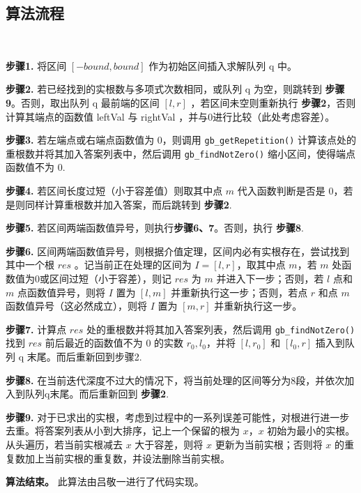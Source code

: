\subsection{算法流程}

\begin{algorithm}[朴素二分法]~
	
	\textbf{步骤1.} 将区间 $[-bound, bound]$ 作为初始区间插入求解队列 q 中。
	
	\textbf{步骤2.} 若已经找到的实根数与多项式次数相同，或队列 q 为空，则跳转到 \textbf{步骤9}。否则，取出队列 q 最前端的区间 $[l, r]$ ，若区间未空则重新执行 \textbf{步骤2}，否则计算其端点的函数值 leftVal 与 rightVal ，并与0进行比较（此处考虑容差）。
	
	\textbf{步骤3.} 若左端点或右端点函数值为 0，则调用 \verb|gb_getRepetition()| 计算该点处的重根数并将其加入答案列表中，然后调用 \verb|gb_findNotZero()| 缩小区间，使得端点函数值不为 0.
	
	\textbf{步骤4.} 若区间长度过短（小于容差值）则取其中点 $m$ 代入函数判断是否是 0，若是则同样计算重根数并加入答案，而后跳转到 \textbf{步骤2}.
	
	\textbf{步骤5.} 若区间两端函数值异号，则执行\textbf{步骤6、7}。否则，执行 \textbf{步骤8}.
	
	\textbf{步骤6.} 区间两端函数值异号，则根据介值定理，区间内必有实根存在，尝试找到其中一个根 $res$ 。记当前正在处理的区间为 $I = [l, r]$，取其中点 $m$，若 $m$ 处函数值为0或区间过短（小于容差），则记 $res$ 为 $m$ 并进入下一步；否则，若 $l$ 点和 $m$ 点函数值异号，则将 $I$ 置为 $[l, m]$ 并重新执行这一步；否则，若点 $r$ 和点 $m$ 函数值异号（这必然成立），则将 $I$ 置为 $[m, r]$ 并重新执行这一步。
	
	\textbf{步骤7.} 计算点 $res$ 处的重根数并将其加入答案列表，然后调用 \verb|gb_findNotZero()| 找到 $res$ 前后最近的函数值不为 0 的实数 $r_0, l_0$，并将 $[l, r_0]$ 和 $[l_0, r]$ 插入到队列 q 末尾。而后重新回到步骤2.
	
	\textbf{步骤8.} 在当前迭代深度不过大的情况下，将当前处理的区间等分为8段，并依次加入到队列q末尾。而后重新回到 \textbf{步骤2}.
	
	\textbf{步骤9.} 对于已求出的实根，考虑到过程中的一系列误差可能性，对根进行进一步去重。将答案列表从小到大排序，记上一个保留的根为 $x$，$x$ 初始为最小的实根。从头遍历，若当前实根减去 $x$ 大于容差，则将 $x$ 更新为当前实根；否则将 $x$ 的重复数加上当前实根的重复数，并设法删除当前实根。
	
	\textbf{算法结束。} 此算法由吕敬一进行了代码实现。
	
	
\end{algorithm}

